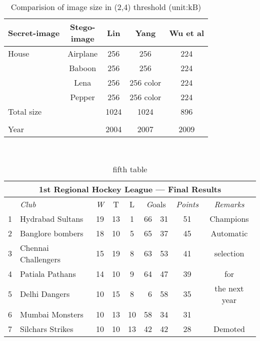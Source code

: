 \documentclass[12pt]{article}
\begin{document}
\newpage
\begin{table}[h]
\caption{Comparision of image size in (2,4) threshold (unit:kB)}\hline
\centering
\begin{tabular}{l c c c c} \hline
Secret-image  & \makecell{ Stego-\\image } &  Lin  &  Yang  & Wu et al \\ \hline
House & Airplane  &  256  &  256  &  224 \\ 
&Baboon  & 256  &  256  & 224 \\
&  Lena  &  256  &256 color  &  224 \\
&Pepper  &  256  &  256 color  &  224 \\
Total size  &  &  1024 &  1024  &  896 \\ \\
Year  & &  2004  &  2007  &  2009  \\  \hline      
\end{tabular}
\end{table}\\

\newpage
\begin{table}[h]
\caption{fifth table} \hline
\centering
\begin{tabular}{|c|l||ccc|r@{:}l|c||c|}
\multicolumn{9}{|c|}{\bfseries 1st Regional Hockey League --- Final Results}\\ \hline
$ $&\textit{Club} & \textit{W}  &T  &L  & \multicolumn{2}{c|}{\textit Goals} &\textit{Points} & \textit{Remarks}\\ \hline\hline
1 & Hydrabad Sultans & 19 & 13 & 1 & 66 & 31 & 51 & Champions \\ \hline
2 & Banglore bombers & 18 & 10 & 5 & 65 & 37 & 45 & Automatic \\ \cline{1-8}
3 & Chennai Challengers & 15 & 19 & 8 & 63 & 53 & 41 & selection\\ \cline{1-8}
4 & Patiala Pathans & 14 & 10 & 9 & 64 & 47 & 39 & for\\ \cline{1-8}
5 & Delhi Dangers & 10 & 15 & 8 & 6 & 58 & 35 & the next year \\ \hline
6 & Mumbai Monsters & 10 & 13 & 10 & 58 & 34 & 31 & \\ \hline
7 & Silchars Strikes & 10 & 10 & 13 & 42 & 42 & 28 & Demoted\\\hline

\end{tabular}

\end{table}
\end{document}
